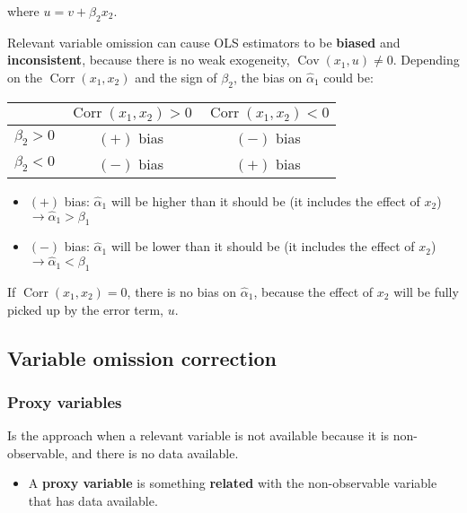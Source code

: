 \documentclass[10pt, a4paper, landscape]{article}
\DeclareMathOperator{\Cov}{Cov}
\DeclareMathOperator{\Corr}{Corr}
\begin{document}
\begin{multicols}{3}
\quad where \( u = v + \beta_{2} x_{2} \).

Relevant variable omission can cause OLS estimators to be \textbf{biased} and \textbf{inconsistent}, because there is no weak exogeneity, \( \Cov(x_{1}, u) \neq 0 \). Depending on the \( \Corr(x_{1}, x_{2}) \) and the sign of \( \beta_{2} \), the bias on \( \hat{\alpha}_{1} \) could be:

\begin{center}
	\begin{tabular}{ c | c c }
		                    & \( \Corr(x_{1}, x_{2}) > 0 \) & \( \Corr(x_{1}, x_{2}) < 0 \) \\ \hline
		\( \beta_{2} > 0 \) & \( (+) \) bias                & \( (-) \) bias                \\
		\( \beta_{2} < 0 \) & \( (-) \) bias                & \( (+) \) bias
	\end{tabular}
\end{center}

\begin{itemize}[leftmargin=*]
	\item \( (+) \) bias: \( \hat{\alpha}_{1} \) will be higher than it should be (it includes the effect of \( x_{2} \)) \( \rightarrow \hat{\alpha}_{1} > \beta_{1} \)
	\item \( (-) \) bias: \( \hat{\alpha}_{1} \) will be lower than it should be (it includes the effect of \( x_{2} \)) \( \rightarrow \hat{\alpha}_{1} < \beta_{1} \)
\end{itemize}

If \( \Corr(x_{1}, x_{2}) = 0 \), there is no bias on \( \hat{\alpha}_{1} \), because the effect of \( x_{2} \) will be fully picked up by the error term, \( u \).

\columnbreak

\subsection*{Variable omission correction}

\subsubsection*{Proxy variables}

Is the approach when a relevant variable is not available because it is non-observable, and there is no data available.

\begin{itemize}[leftmargin=*]
	\item A \textbf{proxy variable} is something \textbf{related} with the non-observable variable that has data available.
\end{itemize}


\end{multicols}
\end{document}
